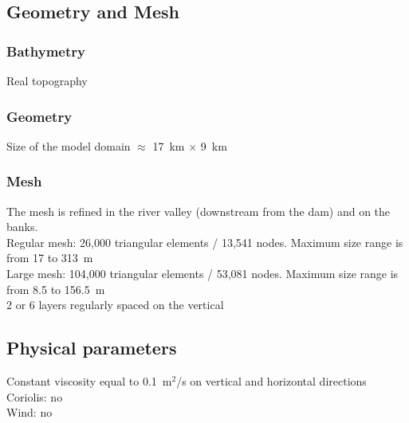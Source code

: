\subsection{Geometry and Mesh}
%
\subsubsection{Bathymetry}
%
Real topography %
%
\subsubsection{Geometry}
%
Size of the model domain $\approx$ 17~km $\times$ 9~km
%
\subsubsection{Mesh}
%
The mesh is refined in the river valley (downstream from the dam)
and on the banks.\\
Regular mesh: 26,000 triangular elements / 13,541 nodes.
Maximum size range is from 17 to 313~m\\
Large mesh: 104,000 triangular elements / 53,081 nodes.
Maximum size range is from 8.5 to 156.5~m\\
2 or 6 layers regularly spaced on the vertical
%
%
%
\subsection{Physical parameters}
%
Constant viscosity equal to 0.1~m$^2$/s on vertical and horizontal
directions\\
Coriolis: no\\
Wind: no
%
%
%
%
%
%
